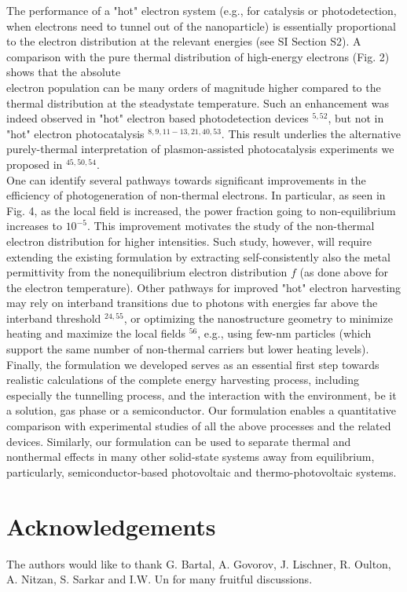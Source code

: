 \documentclass[10pt]{article}
\begin{document}
The performance of a "hot" electron system (e.g., for catalysis or photodetection, when electrons need to tunnel out of the nanoparticle) is essentially proportional to the electron distribution at the relevant energies (see SI Section S2). A comparison with the pure thermal distribution of high-energy electrons (Fig. 2) shows that the absolute\\
electron population can be many orders of magnitude higher compared to the thermal distribution at the steadystate temperature. Such an enhancement was indeed observed in "hot" electron based photodetection devices ${ }^{5,52}$, but not in "hot" electron photocatalysis ${ }^{8,9,11-13,21,40,53}$. This result underlies the alternative purely-thermal interpretation of plasmon-assisted photocatalysis experiments we proposed in ${ }^{45,50,54}$.\\
One can identify several pathways towards significant improvements in the efficiency of photogeneration of non-thermal electrons. In particular, as seen in Fig. 4, as the local field is increased, the power fraction going to non-equilibrium increases to $10^{-5}$. This improvement motivates the study of the non-thermal electron distribution for higher intensities. Such study, however, will require extending the existing formulation by extracting self-consistently also the metal permittivity from the nonequilibrium electron distribution $f$ (as done above for the electron temperature). Other pathways for improved "hot" electron harvesting may rely on interband transitions due to photons with energies far above the interband threshold ${ }^{24,55}$, or optimizing the nanostructure geometry to minimize heating and maximize the local fields ${ }^{56}$, e.g., using few-nm particles (which support the same number of non-thermal carriers but lower heating levels).\\
Finally, the formulation we developed serves as an essential first step towards realistic calculations of the complete energy harvesting process, including especially the tunnelling process, and the interaction with the environment, be it a solution, gas phase or a semiconductor. Our formulation enables a quantitative comparison with experimental studies of all the above processes and the related devices. Similarly, our formulation can be used to separate thermal and nonthermal effects in many other solid-state systems away from equilibrium, particularly, semiconductor-based photovoltaic and thermo-photovoltaic systems.

\section*{Acknowledgements}
The authors would like to thank G. Bartal, A. Govorov, J. Lischner, R. Oulton, A. Nitzan, S. Sarkar and I.W. Un for many fruitful discussions.
\end{document}
